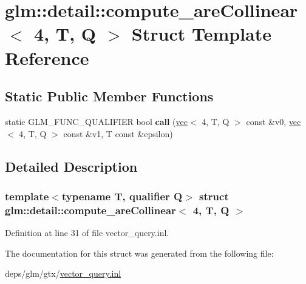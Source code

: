 \hypertarget{structglm_1_1detail_1_1compute__areCollinear_3_014_00_01T_00_01Q_01_4}{}\section{glm\+:\+:detail\+:\+:compute\+\_\+are\+Collinear$<$ 4, T, Q $>$ Struct Template Reference}
\label{structglm_1_1detail_1_1compute__areCollinear_3_014_00_01T_00_01Q_01_4}
\subsection*{Static Public Member Functions}
\begin{DoxyCompactItemize}
\item 
\mbox{\label{structglm_1_1detail_1_1compute__areCollinear_3_014_00_01T_00_01Q_01_4_ad76314dc4d2ebd03e01707e521f91fb9}} 
static G\+L\+M\+\_\+\+F\+U\+N\+C\+\_\+\+Q\+U\+A\+L\+I\+F\+I\+ER bool {\bfseries call} (\hyperlink{structglm_1_1vec}{vec}$<$ 4, T, Q $>$ const \&v0, \hyperlink{structglm_1_1vec}{vec}$<$ 4, T, Q $>$ const \&v1, T const \&epsilon)
\end{DoxyCompactItemize}


\subsection{Detailed Description}
\subsubsection*{template$<$typename T, qualifier Q$>$\newline
struct glm\+::detail\+::compute\+\_\+are\+Collinear$<$ 4, T, Q $>$}



Definition at line 31 of file vector\+\_\+query.\+inl.



The documentation for this struct was generated from the following file\+:\begin{DoxyCompactItemize}
\item 
deps/glm/gtx/\hyperlink{vector__query_8inl}{vector\+\_\+query.\+inl}\end{DoxyCompactItemize}
